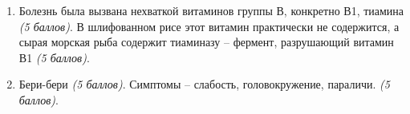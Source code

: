 \solutionSection
\begin{enumerate}
    \item Болезнь была вызвана нехваткой витаминов группы В, конкретно В1, тиамина \textit{(5 баллов)}. В шлифованном рисе этот витамин практически не содержится, а сырая морская рыба содержит тиаминазу – фермент, разрушающий витамин В1 \textit{(5 баллов)}.
    \item Бери-бери \textit{(5 баллов)}. Симптомы – слабость, головокружение, параличи. \textit{(5 баллов)}.
\end{enumerate}